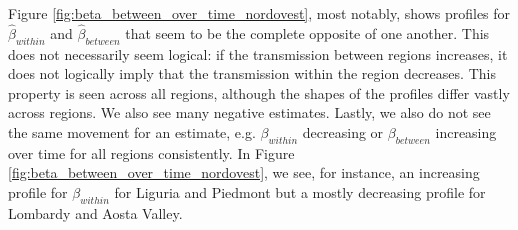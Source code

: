 \documentclass[12pt]{article}
\begin{document}
	Figure \ref{fig:beta_between_over_time_nordovest}, most notably, shows profiles for $\widehat{\beta}_{within}$ and $\widehat{\beta}_{between}$ that seem to be the complete opposite of one another. This does not necessarily seem logical: if the transmission between regions increases, it does not logically imply that the transmission within the region decreases. This property is seen across all regions, although the shapes of the profiles differ vastly across regions. We also see many negative estimates. Lastly, we also do not see the same movement for an estimate, e.g. $\beta_{within}$ decreasing or $\beta_{between}$ increasing over time for all regions consistently. In Figure \ref{fig:beta_between_over_time_nordovest}, we see, for instance, an increasing profile for $\beta_{within}$ for Liguria and Piedmont but a mostly decreasing profile for Lombardy and Aosta Valley.
	
	
	
\end{document}
